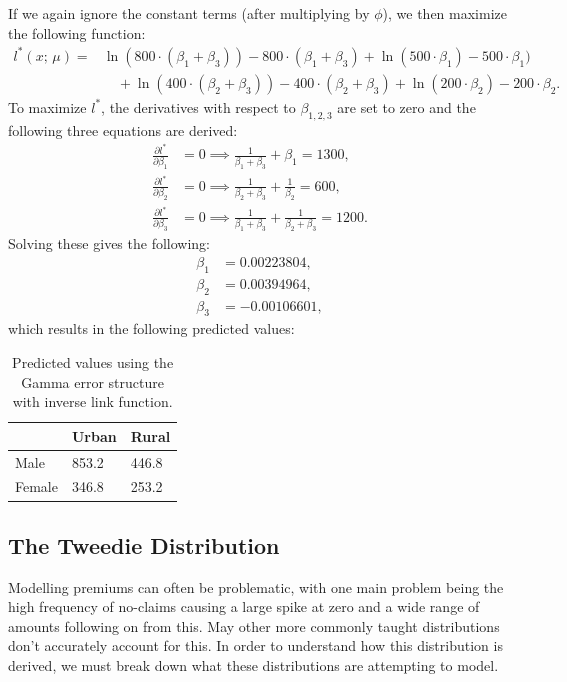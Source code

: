 \documentclass{article}
\begin{document}
If we again ignore the constant terms (after multiplying by $\phi$), we then maximize the following function:
\begin{align}
    l^*(x;\,\mu) = &\ln{(800\cdot(\beta_1+\beta_3))} - 800\cdot(\beta_1+\beta_3) + 
    \ln{(500\cdot\beta_1)} - 500\cdot\beta_1) \nonumber\\
    &\quad+ \ln{(400\cdot(\beta_2+\beta_3))} - 400\cdot(\beta_2+\beta_3) + \ln{(200\cdot\beta_2)} - 200\cdot\beta_2.
\end{align}
To maximize $l^*$, the derivatives with respect to $\beta_{1,2,3}$ are set to zero and the following three equations are derived:
\begin{align}
    \frac{\partial l^*}{\partial\beta_1} &= 0 \implies \frac{1}{\beta_1+\beta_3}+\beta_1 = 1300,\\
    \frac{\partial l^*}{\partial\beta_2} &= 0 \implies \frac{1}{\beta_2+\beta_3}+\frac{1}{\beta_2}=600,\\
    \frac{\partial l^*}{\partial\beta_3} &= 0 \implies \frac{1}{\beta_1+\beta_3}+\frac{1}{\beta_2+\beta_3}=1200.
\end{align}
Solving these gives the following:
\begin{align}
    \beta_1 &= 0.00223804,\\
    \beta_2 &= 0.00394964,\\
    \beta_3 &= -0.00106601,
\end{align}
which results in the following predicted values:
\begin{table}[H]
\centering
\begin{tabular}{l|l|l|}
\cline{2-3}
                             & Urban & Rural \\ \hline
\multicolumn{1}{|l|}{Male}   & 853.2   & 446.8   \\ \hline
\multicolumn{1}{|l|}{Female} & 346.8   & 253.2   \\ \hline
\end{tabular}
    \caption{Predicted values using the Gamma error structure with inverse link function.}
    \label{fig:covariances_example_3}
\end{table}

\subsection{The Tweedie Distribution}
Modelling premiums can often be problematic, with one main problem being the high frequency of no-claims causing a large spike at zero and a wide range of amounts following on from this. May other more commonly taught distributions don't accurately account for this. In order to understand how this distribution is derived, we must break down what these distributions are attempting to model.
\end{document}
